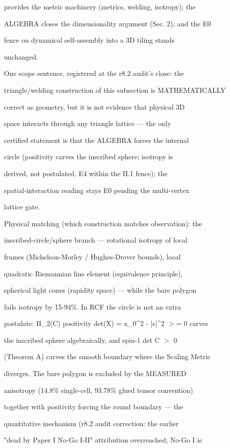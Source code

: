 \documentclass[11pt,a4paper]{article}
\theoremstyle{definition}
\begin{document}
provides the metric machinery (metrics, welding, isotropy); the

ALGEBRA closes the dimensionality argument (Sec. 2); and the E0

fence on dynamical self-assembly into a 3D tiling stands

unchanged.


One scope sentence, registered at the r8.2 audit's close: the

triangle/welding construction of this subsection is MATHEMATICALLY

correct as geometry, but it is not evidence that physical 3D

space interacts through any triangle lattice — the only

certified statement is that the ALGEBRA forces the internal

circle (positivity carves the inscribed sphere; isotropy is

derived, not postulated, E4 within the II.1 fence); the

spatial-interaction reading stays E0 pending the multi-vertex

lattice gate.


Physical matching (which construction matches observation): the

inscribed-circle/sphere branch — rotational isotropy of local

frames (Michelson-Morley / Hughes-Drever bounds), local

quadratic Riemannian line element (equivalence principle),

spherical light cones (rapidity space) — while the bare polygon

fails isotropy by 15-94\%. In RCF the circle is not an extra

postulate: H\_2(C) positivity det(X) = x\_0\^{}2 - |s|\^{}2 $>$= 0 carves

the inscribed sphere algebraically, and spin-1 det C $>$ 0

(Theorem A) carves the smooth boundary where the Scaling Metric

diverges. The bare polygon is excluded by the MEASURED

anisotropy (14.8\% single-cell, 93.78\% glued tensor convention)

together with positivity forcing the round boundary — the

quantitative mechanism (r8.2 audit correction: the earlier

"dead by Paper I No-Go I-II" attribution overreached; No-Go I is
\end{document}
